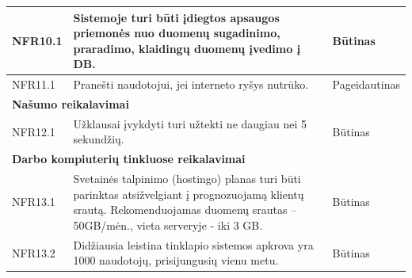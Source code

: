 \documentclass{VUMIFPSkursinis}
\begin{document}
\begin{table}[H]
\begin{tabular}{|p{2cm}|p{10cm}|p{3cm}|}
NFR10.1 & \multicolumn{1}{m{10cm}|}{Sistemoje turi būti įdiegtos apsaugos priemonės nuo duomenų sugadinimo, praradimo, klaidingų duomenų įvedimo į DB.} & Būtinas \\ \hline
NFR11.1 & \multicolumn{1}{m{10cm}|}{Pranešti naudotojui, jei interneto ryšys nutrūko.} & Pageidautinas \\ \hline
\multicolumn{3}{|l|}{\textbf{Našumo reikalavimai}} \\ \hline
NFR12.1 & \multicolumn{1}{m{10cm}|}{Užklausai įvykdyti turi užtekti ne daugiau nei 5 sekundžių.} & Būtinas \\ \hline
\multicolumn{3}{|m{10cm}|}{\textbf{Darbo kompiuterių tinkluose reikalavimai}} \\ \hline
NFR13.1 & \multicolumn{1}{m{10cm}|}{Svetainės talpinimo (hostingo) planas turi būti parinktas atsižvelgiant į prognozuojamą klientų srautą. Rekomenduojamas duomenų srautas – 50GB/mėn., vieta serveryje -  iki 3 GB.} & Būtinas \\ \hline
NFR13.2 & \multicolumn{1}{m{10cm}|}{Didžiausia leistina tinklapio sistemos apkrova yra 1000 naudotojų, prisijungusių vienu
metu.} & Būtinas \\ \hline
\end{tabular}
\end{table}
\end{document}
